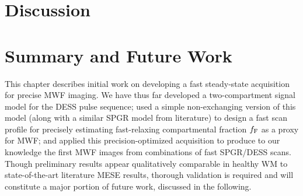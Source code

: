 \section{Discussion}
\label{s,mwf,disc}




\section{Summary and Future Work}
\label{s,mwf,summ}

This chapter describes initial work 
on developing a fast steady-state acquisition
for precise MWF imaging.
We have thus far developed
a two-compartment signal model 
for the DESS pulse sequence;
used a simple non-exchanging version 
of this model 
(along with a similar SPGR model
from literature)
to design a fast scan profile
for precisely estimating 
fast-relaxing compartmental fraction $f_{\mathrm{F}}$
as a proxy for MWF;
and applied this precision-optimized acquisition
\invivo to produce to our knowledge the first MWF images 
from combinations of fast SPGR/DESS scans.
Though preliminary results appear qualitatively comparable
in healthy WM
to state-of-the-art literature MESE results,
thorough validation is required
and will constitute a major portion 
of future work,
discussed in the following.

